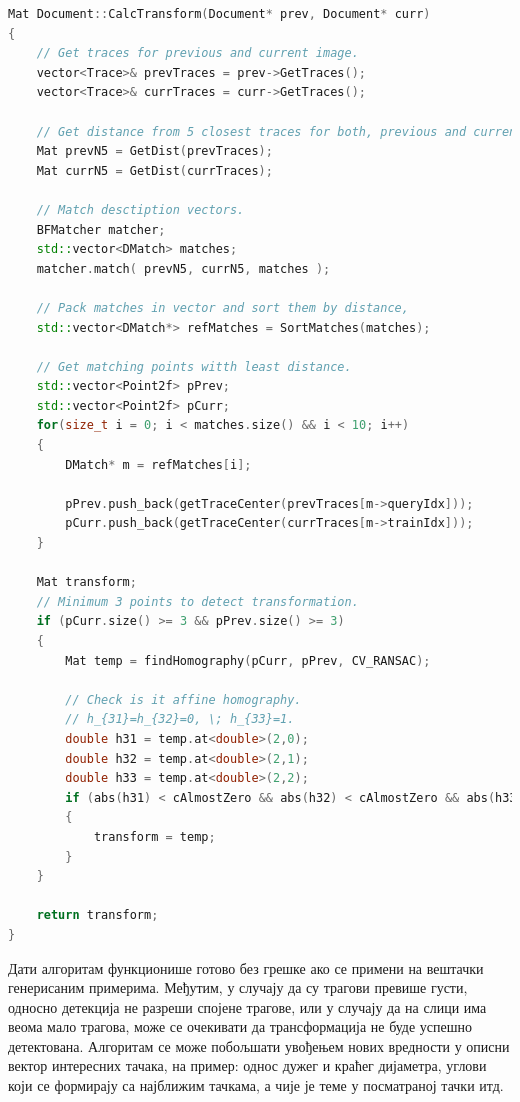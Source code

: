 \documentclass[11pt,a4paper,serbian,oneside]{book}
\begin{document}
\begin{lstlisting}[language=C++,label=lst:surf,caption=Поређење описних вектора и одређивање ротације нове слике]
Mat Document::CalcTransform(Document* prev, Document* curr)
{
    // Get traces for previous and current image.
    vector<Trace>& prevTraces = prev->GetTraces();
    vector<Trace>& currTraces = curr->GetTraces();

    // Get distance from 5 closest traces for both, previous and current image.
    Mat prevN5 = GetDist(prevTraces);
    Mat currN5 = GetDist(currTraces);

    // Match desctiption vectors.
    BFMatcher matcher;
    std::vector<DMatch> matches;
    matcher.match( prevN5, currN5, matches );

    // Pack matches in vector and sort them by distance,
    std::vector<DMatch*> refMatches = SortMatches(matches);

    // Get matching points witth least distance.
    std::vector<Point2f> pPrev;
    std::vector<Point2f> pCurr;
    for(size_t i = 0; i < matches.size() && i < 10; i++)
    {
        DMatch* m = refMatches[i];

        pPrev.push_back(getTraceCenter(prevTraces[m->queryIdx]));
        pCurr.push_back(getTraceCenter(currTraces[m->trainIdx]));
    }

    Mat transform;
    // Minimum 3 points to detect transformation.
    if (pCurr.size() >= 3 && pPrev.size() >= 3)
    {
        Mat temp = findHomography(pCurr, pPrev, CV_RANSAC);

        // Check is it affine homography.
        // h_{31}=h_{32}=0, \; h_{33}=1.
        double h31 = temp.at<double>(2,0);
        double h32 = temp.at<double>(2,1);
        double h33 = temp.at<double>(2,2);
        if (abs(h31) < cAlmostZero && abs(h32) < cAlmostZero && abs(h33 - 1) < cAlmostZero)
        {
            transform = temp;
        }
    }

    return transform;
}
\end{lstlisting}

Дати алгоритам функционише готово без грешке ако се примени на вештачки генерисаним примерима. Међутим, у случају да су трагови превише густи, односно детекција не разреши спојене трагове, или у случају да на слици има веома мало трагова, може се очекивати да трансформација не буде успешно детектована. Алгоритам се може побољшати увођењем нових вредности у описни вектор интересних тачака, на пример: однос дужег и краћег дијаметра, углови који се формирају са најближим тачкама, а чије је теме у посматраној тачки итд. 
\end{document}
